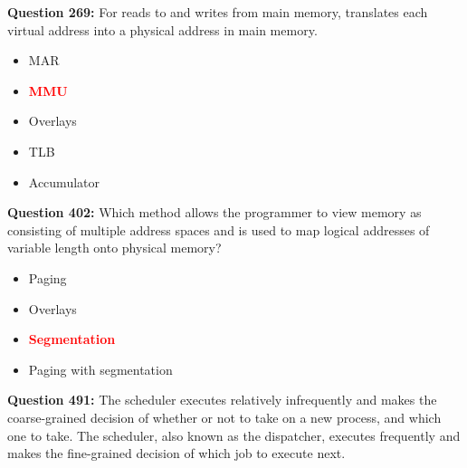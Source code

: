 \documentclass[12pt,a4paper]{article}
\begin{document}
\vspace{0.5cm}

\vspace{0.5cm}

\vspace{0.5cm}

\vspace{0.5cm}

\textbf{Question 269:} For reads to and writes from main memory, \underline{\hspace{1.5cm}} translates each virtual address into a physical address in main memory.

\begin{itemize}
    \item[\textbf{A.}] MAR
    \item[\textbf{B.}] \textcolor{red}{\textbf{MMU}}
    \item[\textbf{C.}] Overlays
    \item[\textbf{D.}] TLB
    \item[\textbf{E.}] Accumulator
\end{itemize}

\vspace{0.5cm}

\vspace{0.5cm}

\textbf{Question 402:} Which method allows the programmer to view memory as consisting of multiple address spaces and is used to map logical addresses of variable length onto physical memory?

\begin{itemize}
    \item[\textbf{A.}] Paging
    \item[\textbf{B.}] Overlays
    \item[\textbf{C.}] \textcolor{red}{\textbf{Segmentation}}
    \item[\textbf{D.}] Paging with segmentation
\end{itemize}

\vspace{0.5cm}

\vspace{0.5cm}

\textbf{Question 491:} The \underline{\hspace{1.5cm}} scheduler executes relatively infrequently and makes the coarse-grained decision of whether or not to take on a new process, and which one to take. The \underline{\hspace{1.5cm}} scheduler, also known as the dispatcher, executes frequently and makes the fine-grained decision of which job to execute next.
\end{document}
